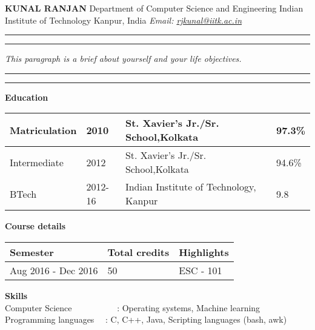 \documentclass{article}
\newcommand\tab[1][1cm]{\hspace*{#1}}
\begin{document}
\noindent\tab[0.2 cm]\textbf{KUNAL RANJAN} \newline
\tab[0.2 cm]Department of Computer Science and Engineering \newline
\tab[0.2 cm]Indian Institute of Technology Kanpur, India \newline
\tab[0.2 cm]\textit{Email: \href{mailto:rjkunal@iitk.ac.in} {rjkunal@iitk.ac.in}} \newline

\hrule
\vspace{0.1cm}
\hrule 
\vspace{0.2cm}
\noindent \textit{This paragraph is a brief about yourself and your life objectives.}\lipsum[6]
\vspace{0.2cm}
\hrule
\vspace{0.1cm}
\hrule
\vspace{0.2cm}
\noindent\tab[0.2 cm]\textbf{Education}
\vspace{0.3cm} \newline
\begin{tabular}{ | l | l| l | l| } 
\hline
Matriculation & 2010 & St. Xavier's Jr./Sr. School,Kolkata & 97.3\% \\ \hline
Intermediate & 2012 & St. Xavier's Jr./Sr. School,Kolkata & 94.6\% \\ 
\hline
BTech & 2012-16 & Indian Institute of Technology, Kanpur & 9.8 \\ 
\hline
\end{tabular}
\vspace{0.6cm} \newline
\noindent\tab[0.2 cm]\textbf{Course details}
\vspace{0.3cm} \newline
\begin{tabular}{ | l | l| l | } 
\hline
\textbf{Semester} & \textbf{Total credits} & \textbf{Highlights}  \\ \hline
Aug 2016 - Dec 2016 & 50 & ESC - 101  \\ 
 \hline
\end{tabular}
\vspace{0.6cm} \newline
\noindent\tab[0.2 cm]\textbf{Skills}
\vspace{0.6cm} \\
\tab[0.2 cm]Computer Science \ \ \ \ \ \ \ \ \ \ : Operating systems, Machine learning \\
\tab[0.2 cm]Programming languages \ \  : C, C++, Java, Scripting languages (bash, awk)
\end{document}
